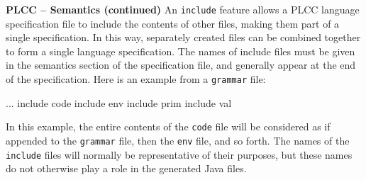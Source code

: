 \begin{minipage}[t]{\sw}
\slidenumber
\LARGE
{\bf PLCC -- Semantics (continued)}\exx
An \verb'include' feature allows a PLCC language specification file
to include the contents of other files,
making them part of a single specification.
In this way, separately created files
can be combined together to form a single language specification.
The names of include files must be given in the semantics section
of the specification file, and generally appear
at the end of the specification.
Here is an example from a \verb'grammar' file:
\begin{qv}
...
include code
include env
include prim
include val
\end{qv}
In this example, the entire contents of the \verb'code' file will be
considered as if appended to the \verb'grammar' file,
then the \verb'env' file, and so forth.
The names of the \verb'include' files
will normally be representative of their purposes,
but these names do not otherwise play a role
in the generated Java files.
\end{minipage}
\clearpage

